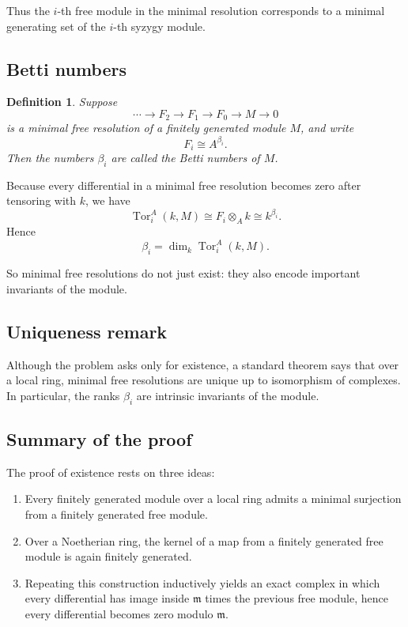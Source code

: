 \documentclass[12pt,a4paper]{article}
\theoremstyle{notespace}
\newtheorem{definition}{Definition}[section]
\DeclareMathOperator{\Tor}{Tor}
\newcommand{\m}{\mathfrak m}
\begin{document}
Thus the \(i\)-th free module in the minimal resolution corresponds to a minimal generating set of the \(i\)-th syzygy module.

\subsection{Betti numbers}

\begin{definition}
	Suppose
	\[
	\cdots \to F_2\to F_1\to F_0\to M\to 0
	\]
	is a minimal free resolution of a finitely generated module \(M\), and write
	\[
	F_i\cong A^{\beta_i}.
	\]
	Then the numbers \(\beta_i\) are called the \emph{Betti numbers} of \(M\).
\end{definition}

Because every differential in a minimal free resolution becomes zero after tensoring with \(k\), we have
\[
\Tor_i^A(k,M)\cong F_i\otimes_A k\cong k^{\beta_i}.
\]
Hence
\[
\beta_i=\dim_k \Tor_i^A(k,M).
\]

So minimal free resolutions do not just exist: they also encode important invariants of the module.

\subsection{Uniqueness remark}

Although the problem asks only for existence, a standard theorem says that over a local ring, minimal free resolutions are unique up to isomorphism of complexes. In particular, the ranks \(\beta_i\) are intrinsic invariants of the module.

\subsection{Summary of the proof}

The proof of existence rests on three ideas:

\begin{enumerate}[leftmargin=2em]
	\item Every finitely generated module over a local ring admits a minimal surjection from a finitely generated free module.
	\item Over a Noetherian ring, the kernel of a map from a finitely generated free module is again finitely generated.
	\item Repeating this construction inductively yields an exact complex in which every differential has image inside \(\m\) times the previous free module, hence every differential becomes zero modulo \(\m\).
\end{enumerate}
\end{document}
